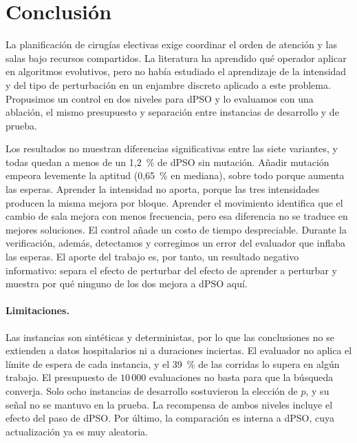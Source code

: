 \documentclass[10pt,a4paper]{article}
\begin{document}
\section{Conclusión}

La planificación de cirugías electivas exige coordinar el orden de atención y las salas bajo
recursos compartidos. La literatura ha aprendido qué operador aplicar en algoritmos evolutivos,
pero no había estudiado el aprendizaje de la intensidad y del tipo de perturbación en un enjambre
discreto aplicado a este problema. Propusimos un control en dos niveles para dPSO y lo evaluamos
con una ablación, el mismo presupuesto y separación entre instancias de desarrollo y de prueba.

Los resultados no muestran diferencias significativas entre las siete variantes, y todas quedan
a menos de un 1,2~\% de dPSO sin mutación. Añadir mutación empeora levemente la aptitud
(0,65~\% en mediana), sobre todo porque aumenta las esperas. Aprender la intensidad no aporta,
porque las tres intensidades producen la misma mejora por bloque. Aprender el movimiento
identifica que el cambio de sala mejora con menos frecuencia, pero esa diferencia no se traduce
en mejores soluciones. El control añade un costo de tiempo despreciable. Durante la verificación,
además, detectamos y corregimos un error del evaluador que inflaba las esperas. El aporte del
trabajo es, por tanto, un resultado negativo informativo: separa el efecto de perturbar del
efecto de aprender a perturbar y muestra por qué ninguno de los dos mejora a dPSO aquí.

\paragraph{Limitaciones.}
Las instancias son sintéticas y deterministas, por lo que las conclusiones no se extienden a
datos hospitalarios ni a duraciones inciertas. El evaluador no aplica el límite de espera de
cada instancia, y el 39~\% de las corridas lo supera en algún trabajo. El presupuesto de
$10\,000$ evaluaciones no basta para que la búsqueda converja. Solo ocho instancias de
desarrollo sostuvieron la elección de $p$, y su señal no se mantuvo en la prueba. La recompensa
de ambos niveles incluye el efecto del paso de dPSO. Por último, la comparación es interna a
dPSO, cuya actualización ya es muy aleatoria.
\end{document}
